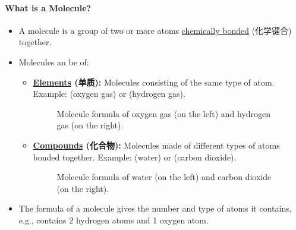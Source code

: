 \paragraph{What is a Molecule?}
\begin{itemize}
    \item A molecule is a group of two or more atoms \underline{chemically bonded} (化学键合) together.
    \item Molecules an be of:
    \begin{itemize}
        \item \textbf{\underline{Elements} (单质):} Molecules consisting of the same type of atom. Example:  (oxygen gas)
        or  (hydrogen gas).
        \begin{figure}[H]
            \centering
             \hspace{1cm} 
            \caption{Molecule formula of oxygen gas (on the left) and hydrogen gas (on the right).}
        \end{figure}
        \item \textbf{\underline{Compounds} (化合物):} Molecules made of different types of atoms bonded together. Example:
         (water) or  (carbon dioxide).
        \begin{figure}[H]
            \centering
             \hspace{1cm} 
            \caption{Molecule formula of water (on the left) and carbon dioxide (on the right).}
        \end{figure}
    \end{itemize}
    \item The formula of a molecule gives the number and type of atoms it contains, e.g.,  contains 2 hydrogen atoms and
    1 oxygen atom.
\end{itemize}

